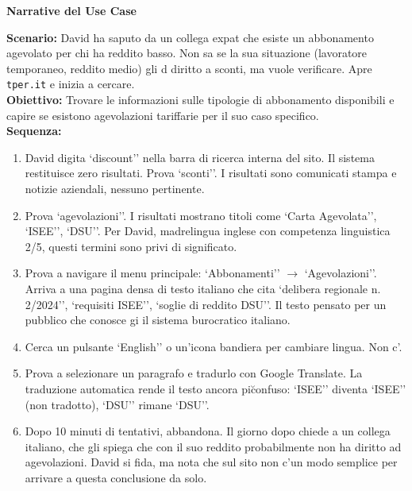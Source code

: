\documentclass[11pt,a4paper]{article}
\begin{document}
\vspace{0.3cm}

\begin{tcolorbox}[colback=backgroundColor,colframe=borderColor,arc=2mm]
    \textbf{Narrative del Use Case} \\[4pt]
    {\small
    \textbf{Scenario:} David ha saputo da un collega expat che esiste un abbonamento agevolato per chi ha reddito basso. Non sa se la sua situazione (lavoratore temporaneo, reddito medio) gli d\ diritto a sconti, ma vuole verificare. Apre \texttt{tper.it} e inizia a cercare. \\[4pt]

    \textbf{Obiettivo:} Trovare le informazioni sulle tipologie di abbonamento disponibili e capire se esistono agevolazioni tariffarie per il suo caso specifico. \\[4pt]

    \textbf{Sequenza:}
    \begin{enumerate}
        \item David digita `discount'' nella barra di ricerca interna del sito. Il sistema restituisce zero risultati. Prova `sconti''. I risultati sono comunicati stampa e notizie aziendali, nessuno pertinente.
        \item Prova `agevolazioni''. I risultati mostrano titoli come `Carta Agevolata'', `ISEE'', `DSU''. Per David, madrelingua inglese con competenza linguistica 2/5, questi termini sono privi di significato.
        \item Prova a navigare il menu principale: `Abbonamenti'' $\rightarrow$ `Agevolazioni''. Arriva a una pagina densa di testo italiano che cita `delibera regionale n. 2/2024'', `requisiti ISEE'', `soglie di reddito DSU''. Il testo \e pensato per un pubblico che conosce gi\ il sistema burocratico italiano.
        \item Cerca un pulsante `English'' o un'icona bandiera per cambiare lingua. Non c'\e.
        \item Prova a selezionare un paragrafo e tradurlo con Google Translate. La traduzione automatica rende il testo ancora pi\u confuso: `ISEE'' diventa `ISEE'' (non tradotto), `DSU'' rimane `DSU''.
        \item Dopo 10 minuti di tentativi, abbandona. Il giorno dopo chiede a un collega italiano, che gli spiega che con il suo reddito probabilmente non ha diritto ad agevolazioni. David si fida, ma nota che sul sito non c'\e un modo semplice per arrivare a questa conclusione da solo.
    \end{enumerate}

}
\end{tcolorbox}
\end{document}
